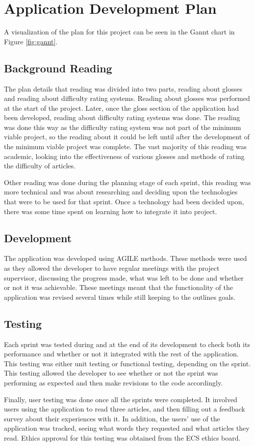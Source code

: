 \chapter{Application Development Plan}

A visualization of the plan for this project can be seen in the Gannt chart in Figure \ref{fig:gannt}.
 

\section{Background Reading}

The plan details that reading was divided into two parts, reading about glosses and reading about difficulty rating systems. Reading about glosses was performed at the start of the project. Later, once the gloss section of the application had been developed, reading about difficulty rating systems was done. The reading was done this way as the difficulty rating system was not part of the minimum viable project, so the reading about it could be left until after the development of the minimum viable project was complete. The vast majority of this reading was academic, looking into the effectiveness of various glosses and methods of rating the difficulty of articles.

Other reading was done during the planning stage of each sprint, this reading was more technical and was about researching and deciding upon the technologies that were to be used for that sprint. Once a technology had been decided upon, there was some time spent on learning how to integrate it into project.


\section{Development}

The application was developed using AGILE methods. These methods were used as they allowed the developer to have regular meetings with the project supervisor, discussing the progress made, what was left to be done and whether or not it was achievable. These meetings meant that the functionality of the application was revised several times while still keeping to the outlines goals. 

\section{Testing}

Each sprint was tested during and at the end of its development to check both its performance and whether or not it integrated with the rest of the application. This testing was either unit testing or functional testing, depending on the sprint. This testing allowed the developer to see whether or not the sprint was performing as expected and then make revisions to the code accordingly.

Finally, user testing was done once all the sprints were completed. It involved users using the application to read three articles, and then filling out a feedback survey about their experiences with it. In addition, the users' use of the application was tracked, seeing what words they requested and what articles they read. Ethics approval for this testing was obtained from the ECS ethics board. 